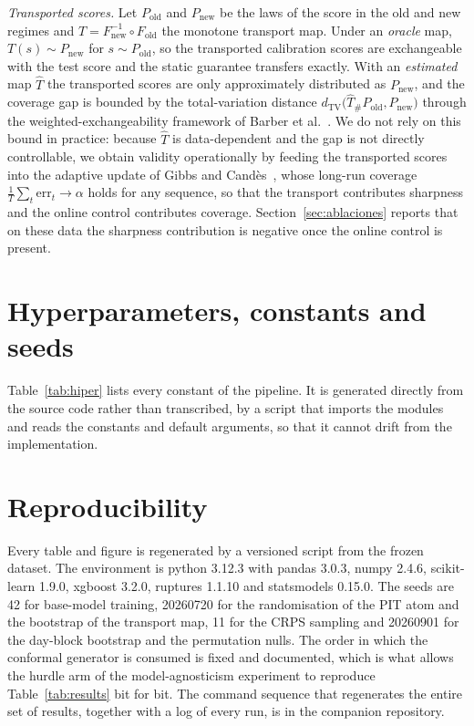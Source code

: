 \documentclass[preprint,3p,times]{elsarticle}
\providecommand{\DIFaddtex}[1]{{\protect\color{blue} \sf #1}} %
\providecommand{\DIFaddbegin}{} %
\providecommand{\DIFaddend}{} %
\providecommand{\DIFadd}[1]{\texorpdfstring{\DIFaddtex{#1}}{#1}} %
\begin{document}
\emph{Transported scores.} Let $P_{\mathrm{old}}$ and $P_{\mathrm{new}}$ be the laws of the score in the old and new regimes and $T=F_{\mathrm{new}}^{-1}\circ F_{\mathrm{old}}$ the monotone transport map. Under an \emph{oracle} map, $T(s)\sim P_{\mathrm{new}}$ for $s\sim P_{\mathrm{old}}$, so the transported calibration scores are exchangeable with the test score and the static guarantee transfers exactly. With an \emph{estimated} map $\hat T$ the transported scores are only approximately distributed as $P_{\mathrm{new}}$, and the coverage gap is bounded by the total-variation distance $d_{\mathrm{TV}}\big(\hat T_\# P_{\mathrm{old}},P_{\mathrm{new}}\big)$ through the weighted-exchangeability framework of Barber et al.~\cite{barber2023}. We do not rely on this bound in practice: because $\hat T$ is data-dependent and the gap is not directly controllable, we obtain validity operationally by feeding the transported scores into the adaptive update of Gibbs and Cand\`es~\cite{gibbs2021}, whose long-run coverage $\frac{1}{T}\sum_t\mathrm{err}_t\to\alpha$ holds for any sequence, so that the transport contributes sharpness and the online control contributes coverage. \DIFaddbegin \DIFadd{Section~\ref{sec:ablaciones} reports that on these data the sharpness contribution is negative once the online control is present.
}\DIFaddend 

\DIFaddbegin \section{Hyperparameters, constants and seeds}
\label{app:hiper}

\DIFadd{Table~\ref{tab:hiper} lists every constant of the pipeline. It is generated directly from the source code rather than transcribed, by a script that imports the modules and reads the constants and default arguments, so that it cannot drift from the implementation.
}



\section{Reproducibility}
\label{app:repro}

\DIFadd{Every table and figure is regenerated by a versioned script from the frozen dataset. The environment is python 3.12.3 with pandas 3.0.3, numpy 2.4.6, scikit-learn 1.9.0, xgboost 3.2.0, ruptures 1.1.10 and statsmodels 0.15.0. The seeds are 42 for base-model training, 20260720 for the randomisation of the PIT atom and the bootstrap of the transport map, 11 for the CRPS sampling and 20260901 for the day-block bootstrap and the permutation nulls. The order in which the conformal generator is consumed is fixed and documented, which is what allows the hurdle arm of the model-agnosticism experiment to reproduce Table~\ref{tab:results} bit for bit. The command sequence that regenerates the entire set of results, together with a log of every run, is in the companion repository.
}
\end{document}
